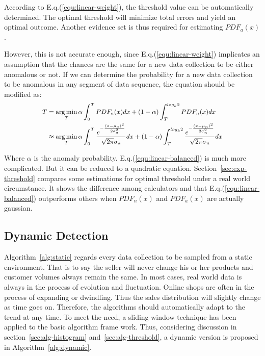 \documentclass[10pt,conference,letterpaper]{IEEEtran}
\begin{document}
			According to E.q.(\ref{equ:linear-weight}), the threshold value can be automatically determined. The optimal threshold will minimize total errors and yield an optimal outcome. Another evidence set is thus required for estimating $PDF_a(x)$.
			
			However, this is not accurate enough, since E.q.(\ref{equ:linear-weight}) implicates an assumption that the chances are the same for a new data collection to be either anomalous or not. If we can determine the probability for a new data collection to be anomalous in any segment of data sequence, the equation should be modified as:
			\begin{equation}\label{equ:linear-balanced}
				{\footnotesize
				\begin{split}
					T & = \mathop{\arg\min}_{T} \alpha\int_{0}^{T}PDF_{a}(x)dx +
					(1-\alpha)\int_{T}^{log_k2}PDF_{n}(x)dx\\
					& \approx \mathop{\arg\min}_{T}
					\alpha\int_{0}^{T}
					\frac{e^{-\frac{(x - \mu_a)^2}{2\sigma_a^2}}}{\sqrt{2\pi} \sigma_a}dx
					+ 
					(1-\alpha)\int_{T}^{log_k2}
					\frac{e^{-\frac{(x - \mu_n)^2}{2\sigma_n^2}}}{\sqrt{2\pi} \sigma_n}dx
				\end{split}}
			\end{equation}
	
			Where $\alpha$ is the anomaly probability. E.q.(\ref{equ:linear-balanced}) is much more complicated. But it can be reduced to a quadratic equation.
			Section~\ref{sec:exp-threshold} compares some estimations for optimal threshold under a real world circumstance. It shows the difference among calculators and that E.q.(\ref{equ:linear-balanced}) outperforms others when $PDF_n(x)$ and $PDF_a(x)$ are actually gaussian.
	
		\subsection{Dynamic Detection}\label{sec:alg-dynamic}
			Algorithm~\ref{alg:static} regards every data collection to be sampled from a static environment. That is to say the seller will never change his or her products and customer volumes always remain the same. In most cases, real world data is always in the process of evolution and fluctuation. Online shops are often in the process of expanding or dwindling. Thus the sales distribution will slightly change as time goes on. Therefore, the algorithms should automatically adapt to the trend at any time. To meet the need, a sliding window technique has been applied to the basic algorithm frame work. Thus, considering discussion in section~\ref{sec:alg-histogram} and~\ref{sec:alg-threshold}, a dynamic version is proposed in Algorithm~\ref{alg:dynamic}.
	
\end{document}
